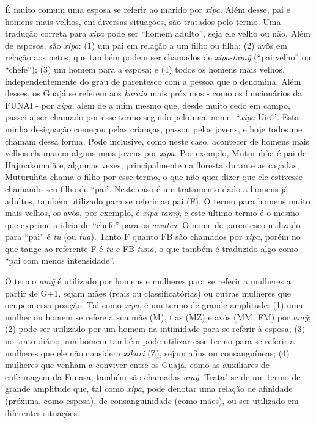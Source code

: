 É muito comum uma esposa se referir ao marido por \emph{xipa}. Além
desse, pai e homens mais velhos, em diversas situações, são tratados
pelo termo. Uma tradução correta para \emph{xipa} pode ser ``homem
adulto'', seja ele velho ou não. Além de esposos, são \emph{xipa}: (1) um
pai em relação a um filho ou filha; (2) avôs em relação aos netos, que
também podem ser chamados de \emph{xipa}-\emph{tamỹ} (``pai velho'' ou
``chefe''); (3) um homem para a esposa; e (4) todos os homens mais velhos,
independentemente do grau de parentesco com a pessoa que o denomina.
Além desses, os Guajá se referem aos \emph{karaia} mais próximos - como
os funcionários da FUNAI - por \emph{xipa}, além de a mim mesmo que,
desde muito cedo em campo, passei a ser chamado por esse termo seguido
pelo meu nome: ``\emph{xipa} Uirá''. Esta minha designação começou pelas
crianças, passou pelos jovens, e hoje todos me chamam dessa forma. Pode
inclusive, como neste caso, acontecer de homens mais velhos chamarem
alguns mais jovens por \emph{xipa}. Por exemplo, Muturuhũa é pai de
Hajmakoma'ã e, algumas vezes, principalmente na floresta durante as
caçadas, Muturuhũa chama o filho por esse termo, o que não quer dizer
que ele estivesse chamando seu filho de ``pai''. Neste caso é um
tratamento dado a homens já adultos, também utilizado para se referir ao
pai (F). O termo para homens muito mais velhos, os avós, por exemplo, é
\emph{xipa tamỹ}, e este último termo é o mesmo que exprime a ideia de
``chefe'' para os \emph{awatea}. O nome de parentesco utilizado para
``pai'' é \emph{tu} (ou \emph{tua}). Tanto F quanto FB são chamados por
\emph{xipa}, porém no que tange ao referente F é \emph{tu} e FB
\emph{tunã}, o que também é traduzido algo como ``pai com menos
intensidade''.

O termo \emph{amỹ} é utilizado por homens e mulheres para se referir a
mulheres a partir de G+1, sejam mães (reais ou classificatórias) ou
outras mulheres que ocupem essa posição. Tal como \emph{xipa}, é um
termo de grande amplitude: (1) uma mulher ou homem se refere a sua mãe
(M), tias (MZ) e avós (MM, FM) por \emph{amỹ}; (2) pode ser utilizado
por um homem na intimidade para se referir à esposa; (3) no trato
diário, um homem também pode utilizar esse termo para se referir a
mulheres que ele não considera \emph{xikari} (Z), sejam afins ou
consanguíneas; (4) mulheres que venham a conviver entre os Guajá, como
as auxiliares de enfermagem da Funasa, também são chamadas \emph{amỹ}.
Trata"-se de um termo de grande amplitude que, tal como \emph{xipa}, pode
denotar uma relação de afinidade (próxima, como esposa), de
consanguinidade (como mães), ou ser utilizado em diferentes situações.


